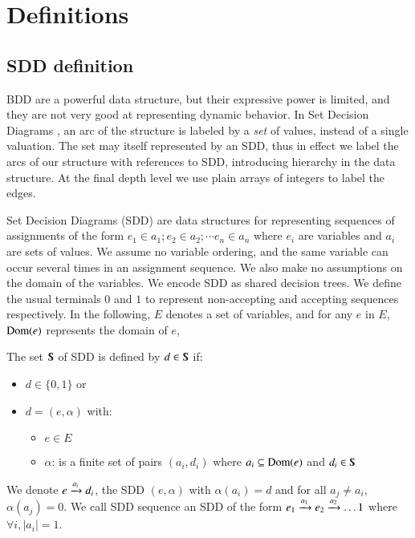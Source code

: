 \section{Definitions}
\label{sec:def}

\subsection{SDD definition}

BDD are a powerful data structure, but their expressive power is
limited, and they are not very good at representing dynamic behavior.
In Set Decision Diagrams \cite{forte05}, an arc of the structure is
labeled by a
\emph{set} of values, instead of a single valuation. The set may itself
represented by an SDD, thus in effect we label the arcs of our
structure with references to SDD, introducing hierarchy in the data
structure. At the final depth level we use plain arrays of integers to
label the edges.



Set Decision Diagrams (SDD) are data structures for representing
sequences of assignments of the form $e_1 \in a_1 ;e_2 \in a_2;
\cdots e_n \in a_n$ where $e_i$ are variables and $a_i$ are sets of values.
We assume no variable ordering, and the same variable can occur
several times in an assignment sequence.  We also make no assumptions
on the domain of the variables. We encode SDD as shared decision
trees.  We define the usual terminals $0$ and $1$ to represent
non-accepting and accepting sequences respectively.  In the following,
$E$ denotes a set of variables, and for any $e$ in $E$, $\mathrm{Dom}(e)$
represents the domain of $e$,

\begin{definition}\label{SDD_Def}
The set $\SDD$ of SDD is defined by $d\in \SDD$ if:
\begin{itemize}
\item $d \in \{0,1\}$ or
\item $d=(e,\alpha)$ with:
 \begin{itemize} \item $e \in E$ \item $\alpha$: is a finite set of
 pairs $(a_i,d_i)$ where $a_i \subseteq \mathrm{Dom}(e)$ and $d_i \in \SDD$
\end{itemize}
\end{itemize}
We denote $e \xrightarrow{\scriptstyle {a_i}} d_i$, the SDD $(e,\alpha)$ with
$\alpha(a_i)=d$ and for all $a_j \neq a_i$, $\alpha(a_j)=0$. We call
SDD sequence an SDD of the form $e_1 \xrightarrow{\scriptstyle {a_1}} e_2 \xrightarrow{\scriptstyle {a_2}}
\ldots 1$ where $\forall i, |a_i|=1$.
\end{definition}

